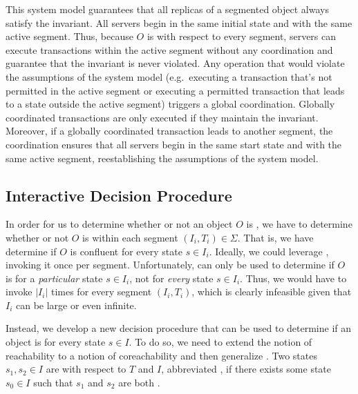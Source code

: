 This system model guarantees that all replicas of a segmented
\invariantconfluent{} object always satisfy the invariant. All servers begin in
the same initial state and with the same active segment. Thus, because $O$ is
\invariantconfluent{} with respect to every segment, servers can execute
transactions within the active segment without any coordination and guarantee
that the invariant is never violated. Any operation that would violate the
assumptions of the \invariantconfluence{} system model (e.g.\ executing a
transaction that's not permitted in the active segment or executing a permitted
transaction that leads to a state outside the active segment) triggers a global
coordination. Globally coordinated transactions are only executed if they
maintain the invariant. Moreover, if a globally coordinated transaction leads
to another segment, the coordination ensures that all servers begin in the same
start state and with the same active segment, reestablishing the assumptions of
the \invariantconfluence{} system model.

\subsection{Interactive Decision Procedure}
In order for us to determine whether or not an object $O$ is \sTISconfluent{},
we have to determine whether or not $O$ is \invariantconfluent{} within each
segment $(I_i, T_i) \in \Sigma$. That is, we have determine if $O$ is
 confluent for every state $s \in I_i$. Ideally, we
could leverage , invoking it once per
segment. Unfortunately,  can only be used
to determine if $O$ is  for a \emph{particular} state
$s \in I_i$, not for \emph{every} state $s \in I_i$. Thus, we would have to
invoke  $|I_i|$ times for every segment
$(I_i, T_i)$, which is clearly infeasible given that $I_i$ can be large or even
infinite.

Instead, we develop a new decision procedure that can be used to determine if
an object is  for every state $s \in I$. To do so, we
need to extend the notion of reachability to a notion of coreachability and
then generalize . Two states $s_1, s_2
\in I$ are  with respect to $T$ and $I$, abbreviated
, if there exists some state $s_0 \in I$ such that
$s_1$ and $s_2$ are both \sTIreachable{}.


